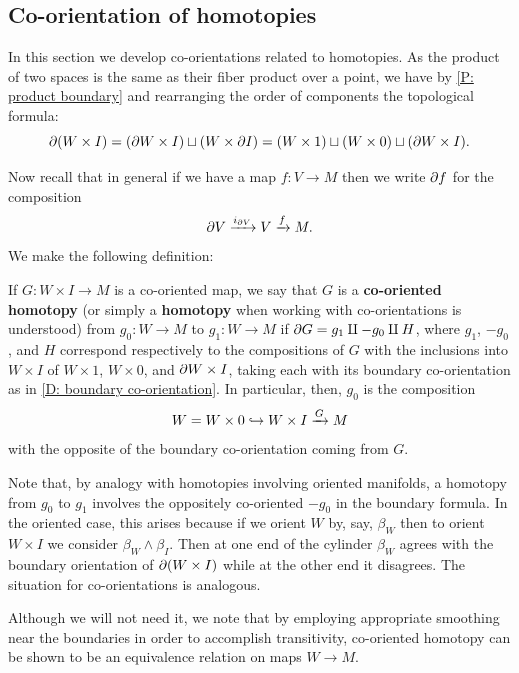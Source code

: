 \subsection{Co-orientation of homotopies}\label{S: co-oriented homotopy}

In this section we develop co-orientations related to homotopies.
As the product of two spaces is the same as their fiber product over a point, we have by \cref{P: product boundary} and rearranging the order of components the topological formula:
\begin{equation*}
	\partial(W \times I) =
	(\partial W \times I) \sqcup (W \times \partial I) =
	(W \times 1) \sqcup (W \times 0) \sqcup (\partial W \times I).
\end{equation*}

Now recall that in general if we have a map $f \colon V \to M$ then we write $\partial f$ for the composition
$$\partial V \xrightarrow{i_{\partial V}} V \xrightarrow{f} M.$$
We make the following definition:

\begin{definition}\label{D: co-oriented homotopy}
	If $G \colon W \times I \to M$ is a co-oriented map, we say that $G$ is a \textbf{co-oriented homotopy} (or simply a \textbf{homotopy} when working with co-orientations is understood) from $g_0 \colon W \to M$ to $g_1 \colon W \to M$ if $\partial G = g_1 \amalg -g_0\amalg H$, where $g_1$, $-g_0$, and $H$ correspond respectively to the compositions of $G$ with the inclusions into $W \times I$ of $W \times 1$, $W \times 0$, and $\partial W \times I$, taking each with its boundary co-orientation as in \cref{D: boundary co-orientation}.
	In particular, then, $g_0$ is the composition
	$$W=W \times 0 \hookrightarrow W \times I \xrightarrow{G} M$$
	with the opposite of the boundary co-orientation coming from $G$.
\end{definition}

Note that, by analogy with homotopies involving oriented manifolds, a homotopy from $g_0$ to $g_1$ involves the oppositely co-oriented $-g_0$ in the boundary formula.
In the oriented case, this arises because if we orient $W$ by, say, $\beta_W$ then to orient $W \times I$ we consider $\beta_W \wedge \beta_I$.
Then at one end of the cylinder $\beta_W$ agrees with the boundary orientation of $\partial (W \times I)$ while at the other end it disagrees.
The situation for co-orientations is analogous.

Although we will not need it, we note that by employing appropriate smoothing near the boundaries in order to accomplish transitivity, co-oriented homotopy can be shown to be an equivalence relation on maps $W \to M$.

